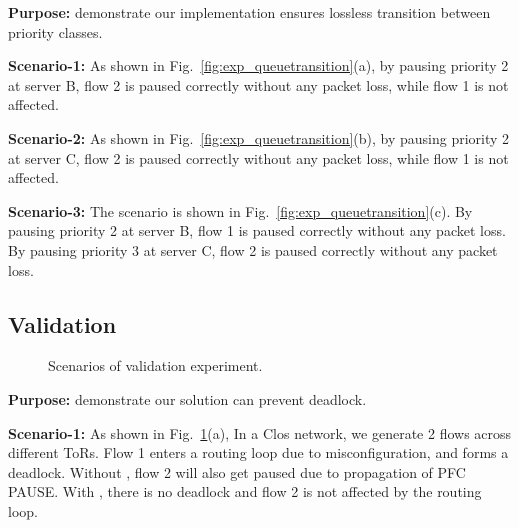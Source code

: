 \textbf{Purpose:} demonstrate our implementation ensures lossless transition between priority classes.

\textbf{Scenario-1:} As shown in Fig.~\ref{fig:exp_queuetransition}(a), by pausing priority 2 at server B, flow 2 is paused correctly without any packet loss, while flow 1 is not affected.

\textbf{Scenario-2:} As shown in Fig.~\ref{fig:exp_queuetransition}(b), by pausing priority 2 at server C, flow 2 is paused correctly without any packet loss, while flow 1 is not affected.

\textbf{Scenario-3:} The scenario is shown in Fig.~\ref{fig:exp_queuetransition}(c). By pausing priority 2 at server B, flow 1 is paused correctly without any packet loss. By pausing priority 3 at server C, flow 2 is paused correctly without any packet loss.

\subsection{Validation}\label{subsec:exp_validation}

\begin{figure}[t]
	\centering
	
	
	\caption{Scenarios of validation experiment.}\label{fig:exp_validation}
	
\end{figure}

\textbf{Purpose:} demonstrate our solution can prevent deadlock.

\textbf{Scenario-1:} As shown in Fig.~\ref{fig:exp_validation}(a), In a Clos network, we generate 2 flows across different ToRs. Flow 1 enters a routing loop due to misconfiguration, and forms a deadlock. Without \sysname{}, flow 2 will also get paused due to propagation of PFC PAUSE. With \sysname{}, there is no deadlock and flow 2 is not affected by the routing loop.

